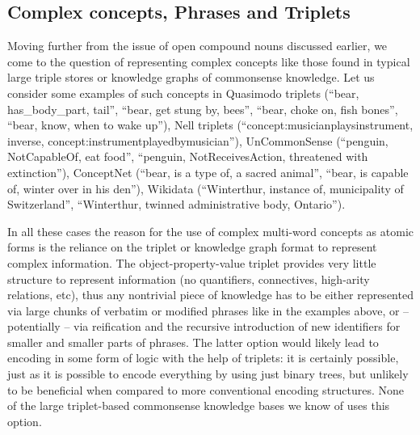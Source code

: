 \documentclass[runningheads]{llncs}
\begin{document}
\subsection{Complex concepts, Phrases and Triplets}

Moving further from the issue of open compound nouns discussed earlier, we come to the question of representing complex concepts like
those found in typical large triple stores or knowledge graphs of commonsense knowledge.  Let us consider some examples
of such concepts in 
Quasimodo 
triplets (``bear, has\_body\_part, tail'', ``bear, get stung by, bees'', ``bear, choke on, fish bones'',
``bear, know, when to wake up''),  
Nell 
triplets (``concept:musicianplaysinstrument, inverse, concept:instrumentplayedbymusician''),
UnCommonSense 
(``penguin, \\
NotCapableOf, eat food'', ``penguin, NotReceivesAction, threatened with extinction''), 
ConceptNet 
(``bear, is a type of, a sacred animal'', ``bear, is capable of, winter over in his den''), 
Wikidata 
(``Winterthur, instance of, municipality of Switzerland'',
``Winterthur, twinned administrative body, Ontario'').

In all these cases the reason for the use of complex multi-word concepts as atomic forms is the reliance on the triplet or knowledge graph
format to represent complex information. The object-property-value triplet provides very little structure to represent
information (no quantifiers, connectives, high-arity relations, etc), thus any nontrivial piece of knowledge has to be
either represented via large chunks of verbatim or modified phrases like in the examples above, or -- potentially --
via reification and the recursive introduction of new identifiers for smaller and smaller parts of phrases. The latter option
would likely lead to encoding in some form of logic with the help of triplets: it is certainly possible, just as it is possible
to encode everything by using just binary trees, but unlikely to be beneficial when compared to more conventional
encoding structures. None of the large triplet-based commonsense knowledge bases we know of uses this option.
\end{document}

